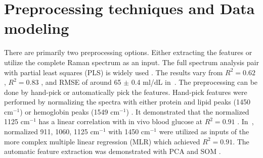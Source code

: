 \section{Preprocessing techniques and Data modeling}

There are primarily two preprocessing options. 
Either extracting the features or utilize the complete Raman spectrum as an input.
The full spectrum analysis pair with partial least squares (PLS) is widely used \citep{forearm2014, sitecompare, forearm2005, directGlucose}.
The results vary from $R^2 = 0.62$ \citep{directGlucose}, $R^2 = 0.83$ \citep{forearm2005,forearm2014}, and RMSE of around 65 $\pm$ 0.4 ml/dL in~\cite{sitecompare}.
The preprocessing can be done by hand-pick \citep{directGlucose,solutionGlucose} or automatically \citep{ramanNailFold2019, sitecompare} pick the features.
Hand-pick features were performed by normalizing the spectra with either protein and lipid peaks (1450 $\text{cm}^{-1}$) \citep{directGlucose} or hemoglobin peaks (1549 $\text{cm}^{-1}$) \citep{solutionGlucose}.
It demonstrated that the normalized 1125 $\text{cm}^{-1}$ has a linear correlation with in vivo blood glucose at $R^2 = 0.91$ \citep{solutionGlucose}.
In~\cite{directGlucose}, normalized 911, 1060, 1125 $\text{cm}^{-1}$ with 1450 $\text{cm}^{-1}$ were utilized as inputs of the more complex multiple linear regression (MLR) which achieved $R^2 = 0.91$.
The automatic feature extraction was demonstrated with PCA \citep{ramanNailFold2019} and SOM \citep{sitecompare}.





